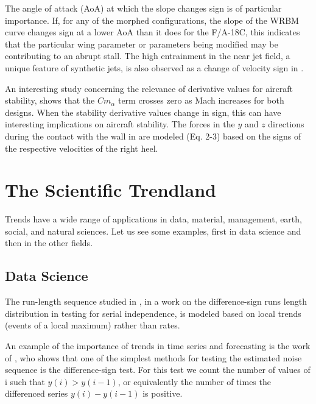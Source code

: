 \documentclass[11pt]{book}
\begin{document}
The angle of attack (AoA) at which the slope changes sign is of particular importance. If, for any of the morphed configurations, the slope of the WRBM curve changes sign at a lower AoA than it does for the F/A-18C, this indicates that the particular wing parameter or parameters being modified may be contributing to an abrupt stall. The high entrainment in the near jet field, a unique feature of synthetic jets, is also observed as a change of velocity sign in \cite{hashiehbaf2014experimental}.

An interesting study concerning the relevance of derivative values for aircraft stability, \cite{allen2017aerodynamic} shows that the $Cm_{\alpha}$ term crosses zero as Mach increases for both designs. When the stability derivative values change in sign, this can have interesting implications on aircraft stability. The forces in the $y$ and $z$ directions during the contact with the wall in \cite{zhang2019effects} are modeled (Eq. 2-3) based on the signs of the respective velocities of the right heel.



\chapter{The Scientific Trendland}

Trends have a wide range of applications in data, material, management, earth, social, and natural sciences. Let us see some examples, first in data science and then in the other fields.


\section{Data Science}

The run-length sequence studied in \cite{cammarota2011difference}, in a work on the difference-sign runs length distribution in testing for serial
independence,
is modeled based on local trends (events of a local maximum) rather
than rates.

An example of the importance of trends in time series and forecasting is the work of \cite{brockwell2016introduction}, who shows that one of the simplest methods for testing the estimated noise sequence is the difference-sign test. For this test we count the number of values of i such that $y\left(i\right)>y\left(i-1\right)$, or equivalently the number of times the differenced series $y\left(i\right)-y\left(i-1\right)$
is positive.
\end{document}
